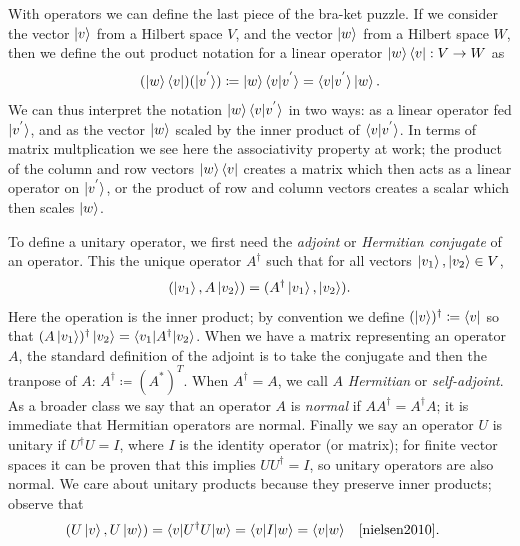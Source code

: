 \documentclass[12pt,twoside]{reedthesis}
\theoremstyle{plain}   %
\theoremstyle{definition}
\theoremstyle{remark}
\numberwithin{equation}{section}
\begin{document}
  With operators we can define the last piece of the bra-ket puzzle. If we consider the vector $\ket{v}$ from a Hilbert space $V$, and the vector $\ket{w}$ from a Hilbert space $W$,
  then we define the out product notation for a linear operator $\ket{w} \bra{v} : V \to W$ as
  \[ (\ket{w} \bra{v}) (\ket{v^{'}}) \coloneq \ket{w} \braket{v|v^{'}} = \braket{v|v^{'}} \ket{w}.\]
  We can thus interpret the notation $\ket{w} \braket{v|v^{'}}$ in two ways: as a linear operator fed $\ket{v^{'}}$, and as the vector $\ket{w}$ scaled by the inner product of $\braket{v|v^{'}}$.
  In terms of matrix multplication we see here the associativity property at work; the product of the column and row vectors $\ket{w} \bra{v}$ creates a matrix which then acts as a linear operator on
  $\ket{v^{'}}$, or the product of row and column vectors creates a scalar which then scales $\ket{w}$.
  \par
  To define a unitary operator, we first need the \emph{adjoint} or \emph{Hermitian conjugate} \cite[2.1.6]{nielsen2010} of an operator.
  This the unique operator $A^\dag$ such that for all vectors $\ket{v_1}, \ket{v_2} \in V$,
  \[(\ket{v_1}, A \ket{v_2}) = ( A^\dag \ket{v_1}, \ket{v_2} ).\]
  Here the operation is the inner product; by convention we define $(\ket{v})^\dag \coloneq \bra{v}$ so that $(A \ket{v_1})^\dag \ket{v_2} = \braket{v_1 | A^\dag |v_2 }$.
  When we have a matrix representing an operator $A$, the standard definition of the adjoint is to take the conjugate and then the tranpose of $A$: $A^\dag \coloneq (A^*)^T$.
  When $A^\dag = A$, we call $A$ \emph{Hermitian} or \emph{self-adjoint}.
  As a broader class we say that an operator $A$ is \emph{normal} if $AA^\dag = A^\dag A$; it is immediate that Hermitian operators are normal.
  Finally we say an operator $U$ is unitary if $U^\dag U = I$, where $I$ is the identity operator (or matrix); for finite vector spaces it can be proven that this implies $ U U^\dag = I$, so unitary
  operators are also normal.
  We care about unitary products because they preserve inner products; observe that
  \begin{align*}
    & (U \ket{v}, U \ket{w}) = \braket{v | U^\dag U  | w} = \braket{v | I | w} = \braket{v | w}  & & \text{\cite[2.36]{nielsen2010}.}
  \end{align*}
\end{document}
